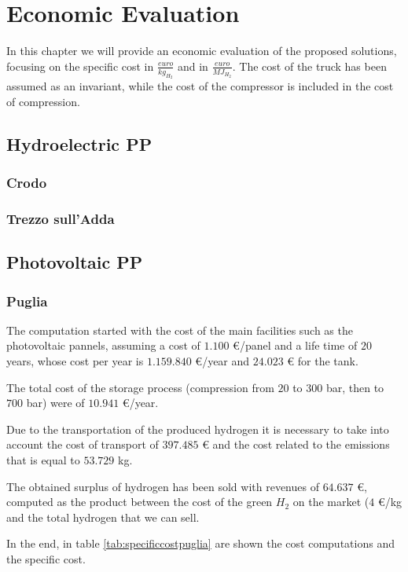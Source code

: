 \newpage
\chapter{Economic Evaluation}
In this chapter we will provide an economic evaluation of the proposed solutions, focusing on the specific cost in $\frac{euro}{kg_{H_2}}$ and in $\frac{euro}{MJ_{H_2}}$. The cost of the truck has been assumed as an invariant, while the cost of the compressor is included in the cost of compression.

\section{Hydroelectric PP}
\subsection{Crodo}
\subsection{Trezzo sull'Adda}

\section{Photovoltaic PP}
\subsection{Puglia}
The computation started with the cost of the main facilities such as the photovoltaic pannels, assuming a cost of $1.100$ €/panel and a life time of $20$ years, whose cost per year is $1.159.840$ €/year and $24.023$ € for the tank\textsuperscript{\cite{alibaba.com2021NewAlibaba.com}}.

The total cost of the storage process (compression from $20$ to $300$ bar, then to $700$ bar) were of $10.941$ €/year. 

Due to the transportation of the produced hydrogen it is necessary to take into account the cost of transport of $397.485$ € and the cost related to the emissions that is equal to $53.729$ kg.

The obtained surplus of hydrogen has been sold with revenues of $64.637$ €, computed as the product between the cost of the green $H_2$ on the market ($4$ €/kg\textsuperscript{\cite{Repubblicasauthor2021Lidrogeno2030}} and the total hydrogen that we can sell.

In the end, in table \ref{tab:specificcostpuglia} are shown the cost computations and the specific cost.

